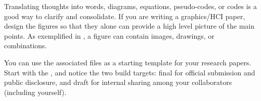 


Translating thoughts into words, diagrams, equations, pseudo-codes, or codes is a good way to clarify and consolidate.
If you are writing a graphics/HCI paper, design the figures so that they alone can provide a high level picture of the main points.
As exemplified in , a figure can contain images, drawings, or combinations. 


You can use the associated files as a starting template for your research papers.
Start with the , and notice the two build targets: final for official submission and public disclosure, and draft for internal sharing among your collaborators (including yourself).

